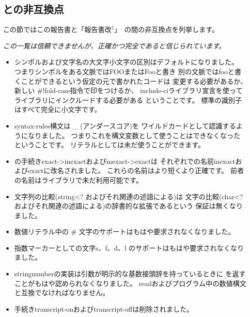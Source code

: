 

\subsection*{\rfivers{}との非互換点}
\label{incompatibilities}

この節ではこの報告書と「報告書改$^5$」~\cite{R5RS}の間の非互換点を列挙します。

{\em この一覧は信頼できませんが、正確かつ完全であると信じられています。}


\begin{itemize}

\item シンボルおよび文字名の大文字小文字の区別はデフォルトになりました。
つまりシンボルをある文脈では{\cf FOO}または{\cf Foo}と書き
別の文脈では{\cf foo}と書くことができるという仮定の元で書かれたコードは
変更する必要があるか、新しい {\cf \#!fold-case}指令で印をつけるか、
{\cf include-ci}ライブラリ宣言を使ってライブラリにインクルードする必要がある
ということです。
標準の識別子はすべて完全に小文字です。

\item {\cf syntax-rules}構文は {\em \_} (アンダースコア)を
ワイルドカードとして認識するようになりました。
つまりこれを構文変数として使うことはできなくなったということです。
リテラルとしては未だ使うことができます。

\item \rfivers{}の手続き{\cf exact->\+inexact}および{\cf inexact->\+exact}は
それぞれ\rsixrs{}での名前{\cf inexact}および{\cf exact}に改名されました。
これらの名前はより短くより正確です。
前者の名前は\rfivers{}ライブラリで未だ利用可能です。

\item 文字列の比較({\cf string<?} およびそれ関連の述語による)は
文字の比較({\cf char<?} およびそれ関連の述語による)の辞書的な拡張であるという
保証は無くなりました。

\item 数値リテラル中の \# 文字のサポートはもはや要求されなくなりました。

\item 指数マーカーとしての文字{\cf s}、{\cf f}、{\cf d}、{\cf l}
のサポートはもはや要求されなくなりました。

\item {\cf string\coerce{}number}の実装は引数が明示的な基数接頭辞を持っているときに %
\schfalse{}を返すことがもはや認められなくなりました。
{\cf read}およびプログラム中の数値構文と互換でなければなりません。

\item 手続き{\cf transcript-on}および{\cf transcript-off}は削除されました。

\end{itemize}

